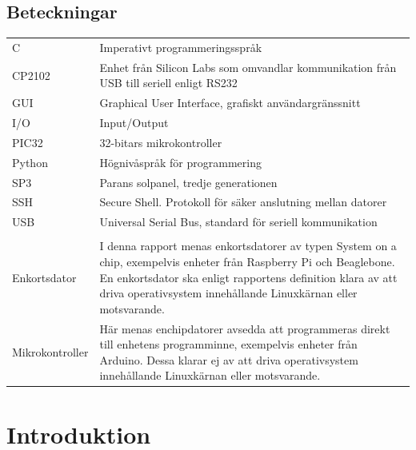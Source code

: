 \documentclass{article}
\begin{document}
    \subsection*{Beteckningar} %
    \label{sub:beteckningar}
        \begin{tabularx}{\textwidth}{@{}lX}
            C & Imperativt programmeringsspråk \\
            CP2102 & Enhet från Silicon Labs som omvandlar kommunikation från
            USB till seriell enligt RS232\\
            GUI & Graphical User Interface, grafiskt användargränssnitt \\
            I/O & Input/Output \\
            PIC32 & 32-bitars mikrokontroller \\
            Python & Högnivåspråk för programmering \\
            SP3 & Parans solpanel, tredje generationen \\
            SSH & Secure Shell. Protokoll för säker anslutning mellan datorer\\
            USB & Universal Serial Bus, standard för seriell kommunikation \\
            \\
            Enkortsdator & I denna rapport menas enkortsdatorer av typen System
            on a chip, exempelvis enheter från Raspberry Pi och Beagle\-bone. 
            En enkortsdator ska enligt rapportens definition klara av att driva 
            operativsystem innehållande Linuxkärnan eller mot\-svarande. \\
            Mikrokontroller & Här menas enchipdatorer avsedda att programmeras 
            direkt till enhetens programminne, exempelvis enheter från 
            \hbox{Arduino}. Dessa klarar ej av att driva operativsystem 
            innehållande Linux\-kärnan eller motsvarande.\\
            

        \end{tabularx}
    \newpage

    \tableofcontents

    \newpage

    \section{Introduktion} %
    \label{sec:introduktion}
\end{document}
